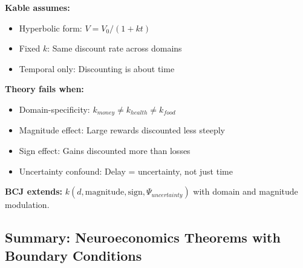 \begin{tcolorbox}[colback=red!5!white, colframe=red!75!black,
    title=Boundary Condition: Where Kable Fails]
\textbf{Kable assumes:}
\begin{itemize}[nosep]
\item Hyperbolic form: $V = V_0/(1+kt)$
\item Fixed $k$: Same discount rate across domains
\item Temporal only: Discounting is about time
\end{itemize}

\textbf{Theory fails when:}
\begin{itemize}[nosep]
\item Domain-specificity: $k_{money} \neq k_{health} \neq k_{food}$
\item Magnitude effect: Large rewards discounted less steeply
\item Sign effect: Gains discounted more than losses
\item Uncertainty confound: Delay = uncertainty, not just time
\end{itemize}

\textbf{BCJ extends:} $k(d, \text{magnitude}, \text{sign}, \Psi_{uncertainty})$ with domain and magnitude modulation.
\end{tcolorbox}


\subsection{Summary: Neuroeconomics Theorems with Boundary Conditions}


